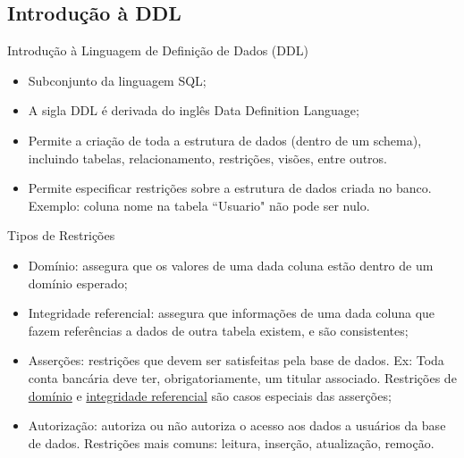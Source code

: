 \documentclass[xcolor=x11names,compress]{beamer}
\begin{document}
\subsection{Introdução à DDL}
\begin{frame}{Introdução à Linguagem de Definição de Dados (DDL)}

\begin{itemize}
\itemsep 5mm

\item Subconjunto da linguagem SQL;

\item A sigla DDL é derivada do inglês Data Definition Language;

\item Permite a criação de toda a estrutura de dados (dentro de um schema), incluindo tabelas, relacionamento, restrições, visões, entre outros.

\item Permite especificar restrições sobre a estrutura de dados criada no banco. Exemplo: coluna nome na tabela ``Usuario" não pode ser nulo.

\end{itemize}

\end{frame}

\begin{frame}[allowframebreaks=.7]{Tipos de Restrições}

\begin{itemize}
\itemsep 5mm

\item Domínio: assegura que os valores de uma dada coluna estão dentro de um domínio esperado;

\item Integridade referencial: assegura que informações de uma dada coluna que fazem referências a dados de outra tabela existem, e são consistentes;

\item Asserções: restrições que devem ser satisfeitas pela base de dados. Ex: Toda conta bancária deve ter, obrigatoriamente, um titular associado. Restrições de \underline{domínio} e \underline{integridade referencial} são casos especiais das asserções;

\item Autorização: autoriza ou não autoriza o acesso aos dados a usuários da base de dados. Restrições mais comuns: leitura, inserção, atualização, remoção. 

\end{itemize}
\end{frame}
\end{document}
